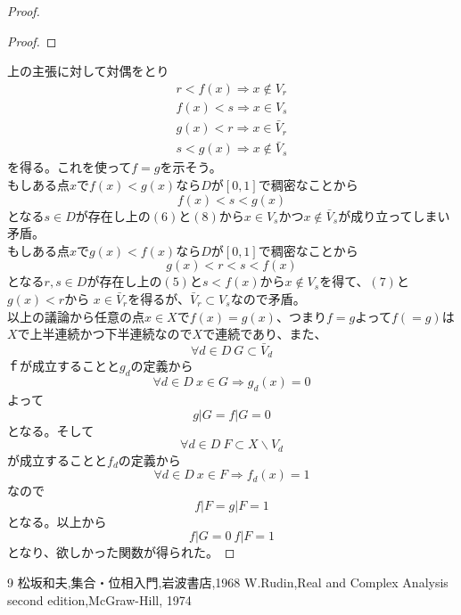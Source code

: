 \documentclass{jsarticle}
\begin{document}
\begin{proof}
\begin{proof}
\end{proof}
上の主張に対して対偶をとり
\begin{eqnarray}
r<f(x)\Rightarrow x\not\in V_r\\ 
f(x)<s\Rightarrow x\in V_s \\ 
g(x)<r\Rightarrow x\in \bar{V}_r\\ 
s<g(x)\Rightarrow x\not\in \bar{V}_s
\end{eqnarray}を得る。これを使って$f=g$を示そう。\\ 
もしある点$x$で$f(x)<g(x)$なら$D$が$[0,1]$で稠密なことから
\[
f(x)<s<g(x)
\]
となる$s\in D$が存在し上の$(6)$と$(8)$から$x\in V_s$かつ$x\not\in \bar{V}_s$が成り立ってしまい矛盾。\\ 
もしある点$x$で$g(x)<f(x)$なら$D$が$[0,1]$で稠密なことから
\[
g(x)<r<s<f(x)
\]
となる$r,s\in D$が存在し上の$(5)$と$s<f(x)$から$x\not\in V_s$を得て、$(7)$と$g(x)<r$から
$x\in \bar{V}_r$を得るが、$\bar{V}_r\subset V_s$なので矛盾。\\ 
以上の議論から任意の点$x\in X$で$f(x)=g(x)$、つまり$f=g$よって$f(=g)$は$X$で上半連続かつ下半連続なので$X$で連続であり、また、
\[
\forall d\in D\ G\subset \bar{V}_d
\]ｆが成立することと$g_d$の定義から
\[
\forall d\in D\ x\in G\Rightarrow g_d(x)=0
\]よって
\[
g|G=f|G=0
\]
となる。そして
\[
\forall d\in D\ F\subset X\backslash V_d
\]が成立することと$f_d$の定義から
\[
\forall d\in D\ x\in F\Rightarrow f_d(x)=1
\]なので
\[
f|F=g|F=1
\]
となる。以上から
\[
f|G=0\ f|F=1
\]となり、欲しかった関数が得られた。
\end{proof}
\begin{thebibliography}{9}
松坂和夫,集合・位相入門,岩波書店,1968
W.Rudin,Real and Complex Analysis second edition,McGraw-Hill, 1974
\end{thebibliography}
\end{document}
